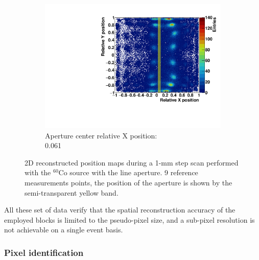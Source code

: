 \begin{figure}
\begin{subfigure}[t]{0.32\textwidth}
\centering
\includegraphics[width=\textwidth]{03_GraphicFiles/chapter3_CLaRySproto/Absorber/images_scan/line_1mm/run00022_floodMap.pdf}
\caption{Aperture center relative X position: \\ 0.061}
\label{chap3::fig::scan_map9_1mm}
\end{subfigure}
\caption{2D reconstructed position maps during a 1-mm step scan performed with the $^{60}$Co source with the line aperture. 9 reference measurements points, the position of the aperture is shown by the semi-transparent yellow band.}
\label{chap3::fig::ScanFloodMap_1mm}
\end{figure}

All these set of data verify that the spatial reconstruction accuracy of the employed blocks is limited to the pseudo-pixel size, and a sub-pixel resolution is not achievable on a single event basis. 


\subsubsection{Pixel identification}\label{chap3::subsubsec::absPixelID}

